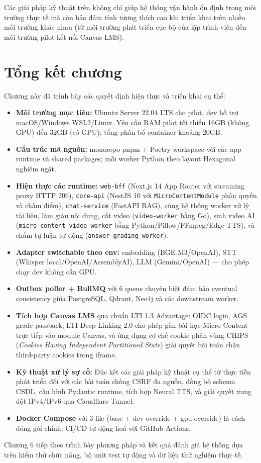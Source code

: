 Các giải pháp kỹ thuật trên không chỉ giúp hệ thống vận hành ổn định trong môi trường thực tế mà còn bảo đảm tính tương thích cao khi triển khai trên nhiều môi trường khác nhau (từ môi trường phát triển cục bộ của lập trình viên đến môi trường pilot kết nối Canvas LMS).

\section{Tổng kết chương}

Chương này đã trình bày các quyết định hiện thực và triển khai cụ thể:

\begin{itemize}
    \item \textbf{Môi trường mục tiêu:} Ubuntu Server 22.04 LTS cho
          pilot; dev hỗ trợ macOS/Windows WSL2/Linux. Yêu cầu RAM
          pilot tối thiểu 16GB (không GPU) đến 32GB (có GPU); tổng
          phân bổ container khoảng 20GB.
    \item \textbf{Cấu trúc mã nguồn:} monorepo pnpm + Poetry workspace
          với các app runtime và shared packages; mỗi worker Python theo
          layout Hexagonal nghiêm ngặt.
    \item \textbf{Hiện thực các runtime:} \texttt{web-bff} (Next.js 14 App Router với streaming proxy HTTP 206),
          \texttt{core-api} (NestJS 10 với \texttt{MicroContentModule} phân quyền và chấm điểm), \texttt{chat-service} (FastAPI RAG),
          cùng hệ thống worker xử lý tài liệu, làm giàu nội dung, cắt video (\texttt{video-worker} bằng Go),
          sinh video AI (\texttt{micro-content-video-worker} bằng Python/Pillow/FFmpeg/Edge-TTS), và chấm tự luận tự động (\texttt{answer-grading-worker}).
    \item \textbf{Adapter switchable theo env:} embedding
          (BGE-M3/OpenAI), STT (Whisper local/OpenAI/AssemblyAI), LLM
          (Gemini/OpenAI) --- cho phép chạy dev không cần GPU.
    \item \textbf{Outbox poller + BullMQ} với 6 queue chuyên biệt đảm bảo eventual consistency
          giữa PostgreSQL, Qdrant, Neo4j và các downstream worker.
    \item \textbf{Tích hợp Canvas LMS} qua chuẩn LTI 1.3 Advantage: OIDC login, AGS grade passback,
          LTI Deep Linking 2.0 cho phép gắn bài học Micro Content trực tiếp vào module Canvas, và ứng dụng cơ chế cookie phân vùng CHIPS (\textit{Cookies Having Independent Partitioned State}) giải quyết bài toán chặn third-party cookies trong iframe.
    \item \textbf{Kỹ thuật xử lý sự cố:} Đúc kết các giải pháp kỹ thuật cụ thể từ thực tiễn phát triển đối với các bài toán chống CSRF đa nguồn, đồng bộ schema CSDL, cấu hình Pydantic runtime, tích hợp Neural TTS, và giải quyết xung đột IPv4/IPv6 qua Cloudflare Tunnel.
    \item \textbf{Docker Compose} với 3 file (base + dev override +
          gpu override) là cách đóng gói chính; CI/CD tự động hoá với GitHub Actions.
\end{itemize}

Chương 6 tiếp theo trình bày phương pháp và kết quả đánh giá hệ thống
dựa trên kiểm thử chức năng, bộ unit test tự động và dữ liệu thử nghiệm thực tế.
